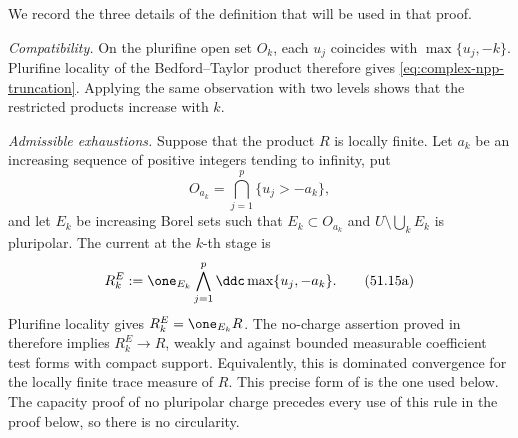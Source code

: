 We record the three details of the definition that will be used in that
proof.

\emph{Compatibility.}  On the plurifine open set $O_k$, each $u_j$
coincides with $\max\{u_j,-k\}$.  Plurifine locality of the
Bedford--Taylor product therefore gives
\eqref{eq:complex-npp-truncation}.  Applying the same observation with two
levels shows that the restricted products increase with $k$.

\emph{Admissible exhaustions.}  Suppose that the product $R$ is locally
finite.  Let $a_k$ be an increasing sequence of positive integers tending
to infinity, put
\[
 O_{a_k}=\bigcap_{j=1}^p\{u_j>-a_k\},
\]
and let $E_k$ be increasing Borel sets such that
$E_k\subset O_{a_k}$ and
$U\setminus\bigcup_kE_k$ is pluripolar.  The current at the $k$-th
stage is
\[
 R_k^{E}:=\one_{E_k}\bigwedge_{j=1}^p
                    \ddc\max\{u_j,-a_k\}.
\tag{51.15a}\label{eq:complex-npp-admissible-exhaustion}
\]
Plurifine locality gives $R_k^{E}=\one_{E_k}R$.  The no-charge assertion
proved in  therefore implies
$R_k^{E}\to R$, weakly and against bounded measurable coefficient test
forms with compact support.  Equivalently, this is dominated convergence for
the locally finite trace measure of $R$.  This precise form of
\cite[Lemma~1.5]{BEGZ10} is the one used below.  The capacity proof of no
pluripolar charge precedes every use of this rule in the proof below, so there
is no circularity.

